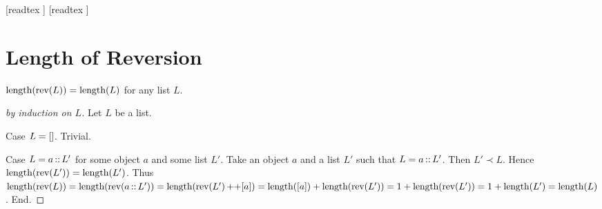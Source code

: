 \documentclass[10pt]{article}
\begin{document}
  \begin{imports}
    \begin{forthel}
      [readtex ]
      [readtex ]
    \end{forthel}
  \end{imports}


  \section*{Length of Reversion}

  \begin{forthel}
    \begin{proposition}[id=LISTS_LENGTHREV_4512036658964875,printid]
      $\textrm{length}(\textrm{rev}(L)) = \textrm{length}(L)$ for any list $L$.
    \end{proposition}
    \begin{proof}[by induction on $L$]
      Let $L$ be a list.
      
      Case $L = []$. Trivial.
      
      Case $L = a \mathop{::} L'$ for some object $a$ and some list $L'$.
        Take an object $a$ and a list $L'$ such that $L = a \mathop{::} L'$.
        Then $L' \prec L$.
        Hence $\textrm{length}(\textrm{rev}(L')) = \textrm{length}(L')$.
        Thus $\textrm{length}(\textrm{rev}(L))
          = \textrm{length}(\textrm{rev}(a \mathop{::} L'))
          = \textrm{length}(\textrm{rev}(L') \mathop{++} [a])
          = \textrm{length}([a]) + \textrm{length}(\textrm{rev}(L'))
          = 1 + \textrm{length}(\textrm{rev}(L'))
          = 1 + \textrm{length}(L')
          = \textrm{length}(L)$.
      End.
    \end{proof}
  \end{forthel}
\end{document}
